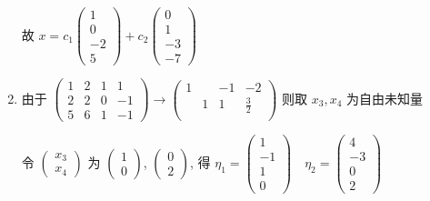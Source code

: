 \begin{enumerate}
                   故 \( x = c_{1}\begin{pmatrix}
                       1  \\
                       0  \\
                       -2 \\
                       5
                   \end{pmatrix} + c_{2}\begin{pmatrix}
                       0  \\
                       1  \\
                       -3 \\
                       -7
                   \end{pmatrix} \)
             \item %
                   由于 \( \begin{pmatrix}
                       1 & 2 & 1 & 1  \\
                       2 & 2 & 0 & -1 \\
                       5 & 6 & 1 & -1
                   \end{pmatrix} \rightarrow \begin{pmatrix}
                       1 &   & -1 & -2          \\
                         & 1 & 1  & \frac{3}{2} \\
                         &   &    &
                   \end{pmatrix} \) 则取 \( x_{3}, x_{4} \) 为自由未知量

                   令 \( \begin{pmatrix}
                       x_{3} \\
                       x_{4}
                   \end{pmatrix} \) 为 \( \begin{pmatrix}
                       1 \\
                       0
                   \end{pmatrix} \), \( \begin{pmatrix}
                       0 \\
                       2
                   \end{pmatrix} \), 得 \( \eta_{1} = \begin{pmatrix}
                       1  \\
                       -1 \\
                       1  \\
                       0
                   \end{pmatrix} \quad \eta_{2} = \begin{pmatrix}
                       4  \\
                       -3 \\
                       0  \\
                       2
                   \end{pmatrix} \)


\end{enumerate}
